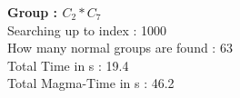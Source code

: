 \textbf{Group : $C_2*C_7$}\\
Searching up to index : 1000\\
How many normal groups are found : 63\\
Total Time in s : 19.4\\
Total Magma-Time in s : 46.2\\
